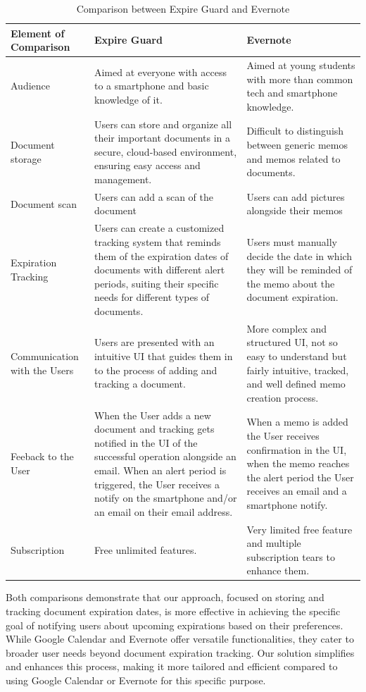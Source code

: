 \begin{table}[H]
	
	\begin{tabularx}{\textwidth}{|X|X|X|}
		\hline
		\textbf{Element of Comparison} & \textbf{Expire Guard} & \textbf{Evernote} \\
		\hline
		Audience  & Aimed at everyone with access to a smartphone and basic knowledge of it. & Aimed at young students with more than common tech and smartphone knowledge.
		
		\\
		\hline
		Document storage & Users can store and organize all their important documents in a secure, cloud-based environment, ensuring easy access and management. & Difficult to distinguish between generic memos and memos related to documents. \\
		\hline
		Document scan & Users can add a scan of the document & Users can add pictures alongside their memos \\
		\hline
		Expiration Tracking & Users can create a customized tracking system that reminds them of the expiration dates of documents with different alert periods, suiting their specific needs for different types of documents. & Users must manually decide the date in which they will be reminded of the memo about the document expiration. \\
		\hline
		Communication with the Users& Users are presented with an intuitive UI that guides them in to the process of adding and tracking a document. & More complex and structured UI, not so easy to understand but fairly intuitive, tracked, and well defined memo creation process. \\
		\hline
		Feeback to the User& When the User adds a new document and tracking gets notified in the UI of the successful operation alongside an email. When an alert period is triggered, the User receives a notify on the smartphone and/or an email on their email address. & When a memo is added the User receives confirmation in the UI, when the memo reaches the alert period the User receives an email and a smartphone notify. \\
		\hline
		Subscription  & Free unlimited features. & Very limited free feature and multiple subscription tears to enhance them. \\
		\hline
	\end{tabularx}
	\caption{Comparison between Expire Guard and Evernote}
\end{table}
\noindent
Both comparisons demonstrate that our approach, focused on storing and tracking document expiration dates, is more effective in achieving the specific goal of notifying users about upcoming expirations based on their preferences. While Google Calendar and Evernote offer versatile functionalities, they cater to broader user needs beyond document expiration tracking. Our solution simplifies and enhances this process, making it more tailored and efficient compared to using Google Calendar or Evernote for this specific purpose.\\

